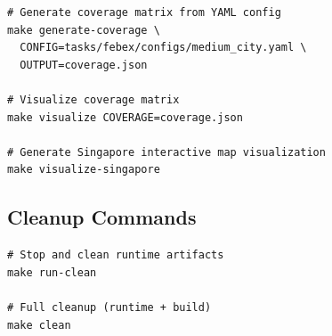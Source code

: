 \begin{verbatim}
# Generate coverage matrix from YAML config
make generate-coverage \
  CONFIG=tasks/febex/configs/medium_city.yaml \
  OUTPUT=coverage.json

# Visualize coverage matrix
make visualize COVERAGE=coverage.json

# Generate Singapore interactive map visualization
make visualize-singapore
\end{verbatim}

\subsection{Cleanup Commands}

\begin{verbatim}
# Stop and clean runtime artifacts
make run-clean

# Full cleanup (runtime + build)
make clean
\end{verbatim}

